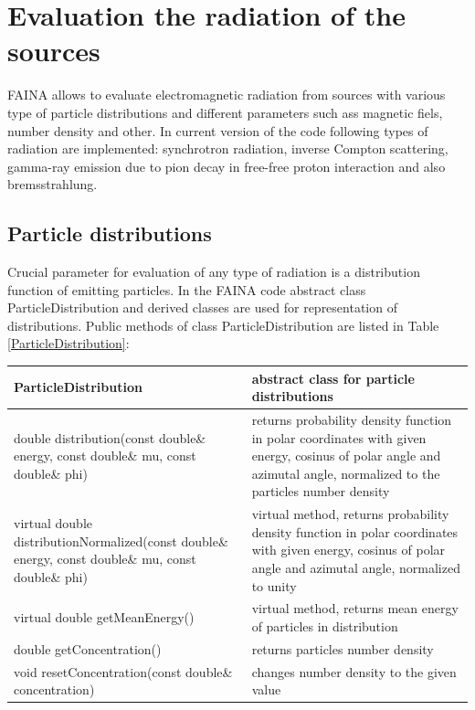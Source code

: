 \chapter{Evaluation the radiation of the sources}\label{radiation}
FAINA allows to evaluate electromagnetic radiation from sources with various type of particle distributions and different parameters such ass magnetic fiels, number density and other. In current version of the code following types of radiation are implemented: synchrotron radiation, inverse Compton scattering, gamma-ray emission due to pion decay in free-free proton interaction and also bremsstrahlung.

\section{Particle distributions}

Crucial parameter for evaluation of any type of radiation is a distribution function of emitting particles. In the FAINA code abstract class ParticleDistribution and derived classes are used for representation of distributions. Public methods of class ParticleDistribution are listed in Table \ref{ParticleDistribution}:

\begin{small}
		\label{ParticleDistribution}
		
		\begin{xtabular}{|p{0.45\textwidth}|p{0.55\textwidth}|}
			\hline
			\textbf{ParticleDistribution} & abstract class for particle distributions\\
			\hline
			double distribution(const double\& energy, const double\& mu, const double\& phi) & returns probability density function in polar coordinates with given energy, cosinus of polar angle and azimutal angle, normalized to the particles number density \\
			\hline
			virtual double distributionNormalized(const double\& energy, const double\& mu, const double\& phi) & virtual method, returns probability density function in polar coordinates with given energy, cosinus of polar angle and azimutal angle, normalized to unity\\
			\hline
			virtual double getMeanEnergy() & virtual method, returns mean energy of particles in distribution\\
			\hline
			double getConcentration() & returns particles number density\\
			\hline
			void resetConcentration(const double\& concentration) & changes number density to the given value\\
			\hline
		\end{xtabular}
\end{small}

